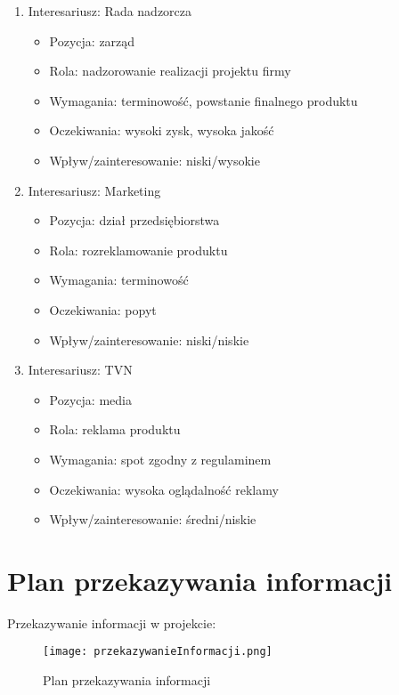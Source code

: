 \begin{enumerate}
	\item Interesariusz: Rada nadzorcza
\begin{itemize}

	\item Pozycja: zarząd
	\item Rola: nadzorowanie realizacji projektu firmy
	\item Wymagania: terminowość, powstanie finalnego produktu
	\item Oczekiwania: wysoki zysk, wysoka jakość
	\item Wpływ/zainteresowanie: niski/wysokie
	\end{itemize}

	\item Interesariusz: Marketing
\begin{itemize}

	\item Pozycja: dział przedsiębiorstwa
	\item Rola: rozreklamowanie produktu
	\item Wymagania: terminowość
	\item Oczekiwania: popyt
	\item Wpływ/zainteresowanie: niski/niskie
	\end{itemize}

	\item Interesariusz: TVN
\begin{itemize}

	\item Pozycja: media
	\item Rola: reklama produktu
	\item Wymagania: spot zgodny z regulaminem
	\item Oczekiwania: wysoka oglądalność reklamy
	\item Wpływ/zainteresowanie: średni/niskie
	\end{itemize}

\end{enumerate}


\section{Plan przekazywania informacji}

Przekazywanie informacji w projekcie: 

\begin{figure}[!h]
\centering
\texttt{[image: przekazywanieInformacji.png]}
\caption{Plan przekazywania informacji}
\label{fig:przekazywanieInformacji}
\end{figure}

